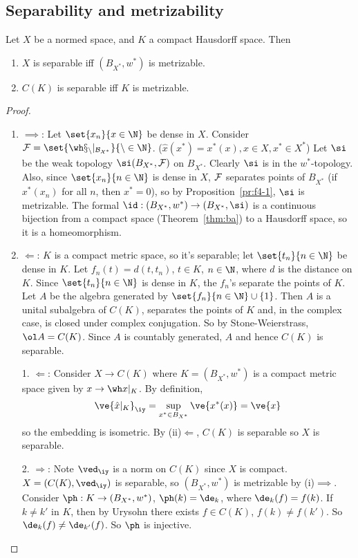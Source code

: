 \subsection{Separability and metrizability}
\begin{pr}
Let $X$ be a normed space, and $K$ a compact Hausdorff space. Then 
\begin{enumerate}
\item
$X$ is separable iff $(B_{X^*},w^*)$ is metrizable.
\item
$C(K)$ is separable iff $K$ is metrizable.
\end{enumerate}
\end{pr}
\begin{proof}
\begin{enumerate}
\item
$\implies$: Let $\set{x_n}{x\in \N}$ be dense in $X$. Consider $\cal F=\set{\wh x_n|_{B_{X^*}}}{n\in \N}$. ($\hat x(x^*)=x^*(x), x\in X, x^*\in X^*$) Let $\si$ be the weak topology $\si(B_{X^*},\cal F)$ on $B_{X^*}$. Clearly $\si$ is in the $w^*$-topology. Also, since $\set{x_n}{n\in \N}$ is dense in $X$, $\cal F$ separates points of $B_{X^*}$ (if $x^*(x_n)$ for all $n$, then $x^*=0$), so by Proposition~\ref{pr:f4-1}, $\si$ is metrizable. The formal $\id:(B_{X^*},w^*)\to (B_{X^*},\si)$ is a continuous bijection from a compact space (Theorem~\ref{thm:ba}) to a Hausdorff space, so it is a homeomorphism.
\item
$\Leftarrow$: $K$ is a compact metric space, so it's separable; let $\set{t_n}{n\in \N}$ be dense in $K$. Let $f_n(t)=d(t,t_n)$, $t\in K$, $n\in \N$, where $d$ is the distance on $K$. Since $\set{t_n}{n\in \N}$ is dense in $K$, the $f_n$'s separate the points of $K$. Let $A$ be the algebra generated by $\set{f_n}{n\in \N}\cup \{1\}$. Then $A$ is a unital subalgebra of $C(K)$, separates the points of $K$ and, in the complex case, is closed under complex conjugation. So by Stone-Weierstrass, $\ol A=C(K)$. Since $A$ is countably generated, $A$ and hence $C(K)$ is separable. 
\item[1.] $\Leftarrow$: Consider $X\to C(K)$ where $K=(B_{X^*}, w^*)$ is a compact metric space given by $x\to \wh x|_K$. %
By definition, 
\[
\ve{\hat x|_K}_{\iy}=\sup_{x^*\in B_{X^*}}\ve{x^*(x)}=\ve{x}
\]
so the embedding is isometric. By (ii)$\Leftarrow$, $C(K)$ is separable so $X$ is separable.
\item[2.] $\Rightarrow$: Note $\ved_{\iy}$ is a norm on $C(K)$ since $X$ is compact. $X=(C(K), \ved_{\iy})$ is separable, so $(B_{X^*},w^*)$ is metrizable by (i)$\implies$. Consider $\ph:K\to (B_{X^*},w^*)$, $\ph(k)=\de_k$, where $\de_k(f)=f(k)$. If $k\ne k'$ in $K$, then by Urysohn there exists $f\in C(K)$, $f(k)\ne f(k')$. So $\de_k(f)\ne \de_{k'}(f)$. So $\ph$ is injective.


\end{enumerate}
\end{proof}
